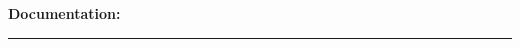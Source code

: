 \documentclass{exam}
\begin{document}
\begin{questions}
\begin{parts}
\end{parts}

\end{questions}

\vspace{1.0em}
\noindent\textbf{Documentation:} \rule[-2pt]{0.6\linewidth}{0.4pt}
\end{document}
